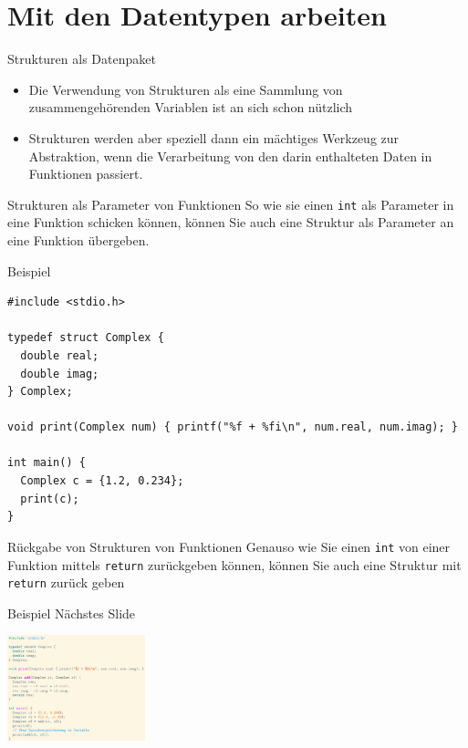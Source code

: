 \documentclass[presentation]{beamer}
\begin{document}
\section{Mit den Datentypen arbeiten}
\label{sec:org516dccc}
\begin{frame}[label={sec:org8332606}]{Strukturen als Datenpaket}
\begin{itemize}
\item Die Verwendung von Strukturen als \alert{eine Sammlung von
zusammengehörenden Variablen} ist an sich schon nützlich
\item Strukturen werden aber speziell dann ein mächtiges Werkzeug zur
Abstraktion, wenn die Verarbeitung von den darin enthalteten Daten
in Funktionen passiert.
\end{itemize}
\end{frame}
\begin{frame}[label={sec:org1faff1f},fragile]{Strukturen als Parameter von Funktionen}
 So wie sie einen {\color{solarizedYellow}\texttt{int} }als Parameter in eine Funktion schicken können,
können Sie auch eine Struktur als Parameter an eine Funktion
übergeben.
\begin{exampleblock}{Beispiel}
\begin{verbatim}
#include <stdio.h>

typedef struct Complex {
  double real;
  double imag;
} Complex;

void print(Complex num) { printf("%f + %fi\n", num.real, num.imag); }

int main() {
  Complex c = {1.2, 0.234};
  print(c);
}
\end{verbatim}
\end{exampleblock}
\end{frame}
\begin{frame}[label={sec:org540bcb5},fragile]{Rückgabe von Strukturen von Funktionen}
 Genauso wie Sie einen {\color{solarizedYellow}\texttt{int} }von einer Funktion mittels {\color{solarizedYellow}\texttt{return}}
zurückgeben können, können Sie auch eine Struktur mit {\color{solarizedYellow}\texttt{return} }zurück
geben
\begin{exampleblock}{Beispiel}
\center
Nächstes Slide
\begin{center}\begin{center}
\includegraphics[width=0.3\textwidth]{data/b1/ec1282-fa9f-4a02-abc6-b8b219020ccc/screenshot-20200306-173506.png}
\end{center}\end{center}
\end{exampleblock}
\end{frame}
\end{document}
